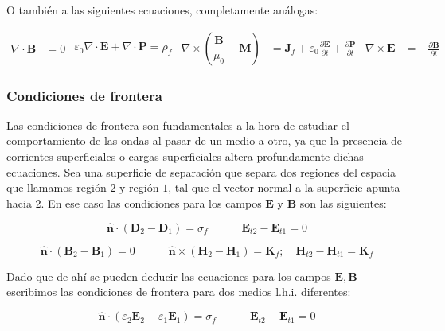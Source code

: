 \documentclass[12pt,a4paper]{article}
\newcommand{\parentesis}[1]{\left( #1  \right)}
\newcommand{\parciales}[2]{\frac{\partial #1}{\partial #2}}
\newcommand{\tquad}{\quad \quad \quad}
\newcommand{\rota}{\nabla \times}
\newcommand{\dive}{\nabla \cdot}
\newcommand{\Bn}{\mathbf{B}}
\newcommand{\En}{\mathbf{E}}
\newcommand{\Dn}{\mathbf{D}}
\newcommand{\Hn}{\mathbf{H}}
\newcommand{\Jn}{\mathbf{J}}
\newcommand{\Kn}{\mathbf{K}}
\newcommand{\Pn}{\mathbf{P}}
\newcommand{\Mn}{\mathbf{M}}
\newcommand{\hnn}{\hat{\mathbf{n}}}
\numberwithin{equation}{section}
\numberwithin{figure}{section}
\begin{document}
O también a las siguientes ecuaciones, completamente análogas:



\begin{subequations}\label{Ec:5.1.8.Maxwell}
\begin{align}
\dive \Bn & = 0 \label{Ec:5.1.8.a.DivB}
\end{align}
\begin{align}
 \varepsilon_0 \dive \En + \dive \Pn = \rho_f \label{Ec:5.1.8.b.DivE}
\end{align}
\begin{align}
\rota \parentesis{\dfrac{\Bn}{\mu_0}-\Mn}  & =  \Jn_f + \varepsilon_0 \parciales{\En}{t} + \parciales{\Pn}{t} \label{Ec:5.1.8.c.RotB} 
\end{align}
\begin{align}
\rota \En  & = -  \parciales{\Bn}{t} \label{Ec:5.1.8.d.RotE}
\end{align}
\end{subequations}

\subsubsection{Condiciones de frontera} \label{Subsub:5.1.4}

Las condiciones de frontera son fundamentales a la hora de estudiar el comportamiento de las ondas al pasar de un medio a otro, ya que la presencia de corrientes superficiales o cargas superficiales altera profundamente dichas ecuaciones. Sea una superficie de separación que separa dos regiones del espacia que llamamos región $2$ y región $1$, tal que el vector normal a la superficie apunta hacia 2. En ese caso las condiciones para los campos $\En$ y $\Bn$ son las siguientes:


\begin{equation}
\hnn \cdot (\Dn_2 - \Dn_1) = \sigma_f \tquad \En_{t2}-\En_{t1}=0
\end{equation}

\begin{equation}
\hnn \cdot (\Bn_2-\Bn_1)=0  \tquad \hnn \times (\Hn_2 - \Hn_1) = \Kn_f; \quad \Hn_{t2} - \Hn_{t1} = \Kn_f 
\end{equation}

Dado que de ahí se pueden deducir las ecuaciones para los campos $\En,\Bn$ escribimos las condiciones de frontera para dos medios l.h.i. diferentes:


\begin{equation}
\hnn \cdot (\varepsilon_2 \En_2 - \varepsilon_1 \En_1) = \sigma_f \tquad \En_{t2}-\En_{t1}=0
\end{equation}
\end{document}
